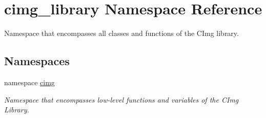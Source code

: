 \hypertarget{namespacecimg__library}{
\section{cimg\_\-library Namespace Reference}
\label{namespacecimg__library}
}


Namespace that encompasses all classes and functions of the CImg library.  


\subsection*{Namespaces}
\begin{DoxyCompactItemize}
\item 
namespace \hyperlink{namespacecimg__library_1_1cimg}{cimg}


\begin{DoxyCompactList}\small\item\em Namespace that encompasses {\itshape low-\/level\/} functions and variables of the CImg Library. \item\end{DoxyCompactList}

\end{DoxyCompactItemize}
